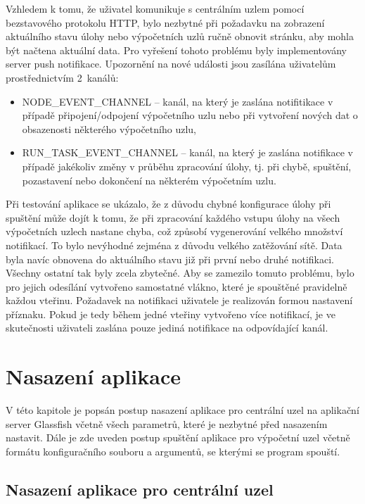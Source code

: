 Vzhledem k tomu, že uživatel komunikuje s centrálním uzlem pomocí bezstavového protokolu HTTP, bylo nezbytné při požadavku na zobrazení aktuálního stavu úlohy nebo výpočetních uzlů ručně obnovit stránku, aby mohla být načtena aktuální data. Pro vyřešení tohoto problému byly implementovány server push notifikace. Upozornění na nové události jsou zasílána uživatelům prostřednictvím 2~kanálů:
\begin{itemize}
    \item NODE\_EVENT\_CHANNEL -- kanál, na který je zaslána notifitikace v případě připojení/odpojení výpočetního uzlu nebo při vytvoření nových dat o obsazenosti některého výpočetního uzlu,
    \item RUN\_TASK\_EVENT\_CHANNEL -- kanál, na který je zaslána notifikace v případě jakékoliv změny v průběhu zpracování úlohy, tj. při chybě, spuštění, pozastavení nebo dokončení na některém výpočetním uzlu.
\end{itemize}

Při testování aplikace se ukázalo, že z důvodu chybné konfigurace úlohy při spuštění může dojít k tomu, že při zpracování každého vstupu úlohy na všech výpočetních uzlech nastane chyba, což způsobí vygenerování velkého množství notifikací. To bylo nevýhodné zejména z důvodu velkého zatěžování sítě. Data byla navíc obnovena do aktuálního stavu již při první nebo druhé notifikaci. Všechny ostatní tak byly zcela zbytečné. Aby se zamezilo tomuto problému, bylo pro jejich odesílání vytvořeno samostatné vlákno, které je spouštěné pravidelně každou vteřinu. Požadavek na notifikaci uživatele je realizován formou nastavení příznaku. Pokud je tedy během jedné vteřiny vytvořeno více notifikací, je ve skutečnosti uživateli zaslána pouze jediná notifikace na odpovídající kanál.

\section{Nasazení aplikace}

V této kapitole je popsán postup nasazení aplikace pro centrální uzel na aplikační server Glassfish včetně všech parametrů, které je nezbytné před nasazením nastavit. Dále je zde uveden postup spuštění aplikace pro výpočetní uzel včetně formátu konfiguračního souboru a argumentů, se kterými se program spouští.

\subsection*{Nasazení aplikace pro centrální uzel}

